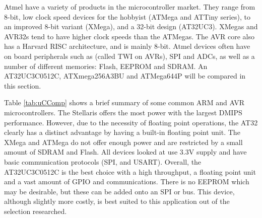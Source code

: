 Atmel have a variety of products in the microcontroller market. They range from 8-bit, low clock speed devices for the hobbyist (ATMega and ATTiny series), to an improved 8-bit variant (XMega), and a 32-bit design (AT32UC3). XMegas and AVR32s tend to have higher clock speeds than the ATMegas. The AVR core also has a Harvard RISC architecture, and is mainly 8-bit. Atmel devices often have on board peripherals such as \itc (called TWI on AVRs), SPI and ADCs, as well as a number of different memories: Flash, EEPROM and SDRAM. An AT32UC3C0512C, ATXmega256A3BU and ATMega644P will be compared in this section. 


Table \ref{tab:uCComp} shows a brief summary of some common ARM and AVR microcontrollers. The Stellaris offers the most power with the largest DMIPS performance. However, due to the necessity of floating point operations, the AT32 clearly has a distinct advantage by having a built-in floating point unit. The XMega and ATMega do not offer enough power and are restricted by a small amount of SDRAM and Flash. All devices looked at use 3.3V supply and have basic communication protocols (SPI, \itc and USART). Overall, the AT32UC3C0512C is the best choice with a high throughput, a floating point unit and a vast amount of GPIO and communications. There is no EEPROM which may be desirable, but these can be added onto an SPI or \itc bus. This device, although slightly more costly, is best suited to this application out of the selection researched.

